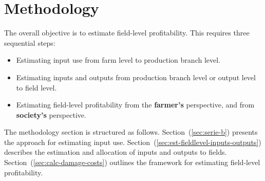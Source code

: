 \documentclass[12pt]{article}
\begin{document}


\newpage


\section{Methodology}
\label{sec:methodology}
The overall objective is to estimate field-level profitability.
This requires three sequential steps:
\begin{itemize}
    \item[1.] Estimating input use from farm level to production branch level.
    \item[2.] Estimating inputs and outputs from production branch level or output level to field level.
    \item[3.] Estimating field-level profitability from the \textbf{farmer's} perspective, and from \textbf{society's} perspective.
\end{itemize}
The methodology section is structured as follows. 
Section~(\ref{sec:serie-b}) presents the approach for estimating input use. 
Section~(\ref{sec:est-fieldlevel-inputs-outputs}) describes the estimation and allocation of inputs and outputs to fields. 
Section~(\ref{sec:calc-damage-costs}) outlines the framework for estimating field-level profitability.
\end{document}
